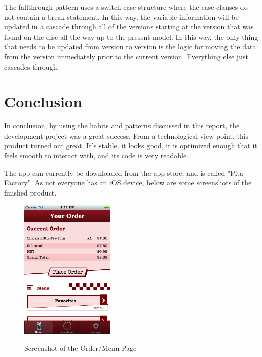 \documentclass[se]{uw-wkrpt}
\begin{document}
The fallthrough pattern uses a switch case structure where the case clauses do not contain a break statement.
In this way, the variable information will be updated in a cascade through all of the versions starting
at the version that was found on the disc all the way up to the present model. In this way, the only
thing that needs to be updated from version to version is the logic for moving the data from the version
immediately prior to the current version. Everything else just cascades through.

\section{Conclusion}

In conclusion, by using the habits and patterns discussed in this report, the development project was a 
great success. From a technological view point, this product turned out great. It's stable, it looks good,
it is optimized enough that it feels smooth to interact with, and its code is very readable. 

The app can currently be downloaded from the app store, and is called "Pita Factory". As
not everyone has an iOS device, below are some screenshots of the finished product.

\begin{figure}[h!]
  \caption{Screenshot of the Order/Menu Page}
  \centering
    \includegraphics[width=0.4\textwidth]{orderMenuPage}
  \label{fig:Menu Page}
\end{figure}
\end{document}
